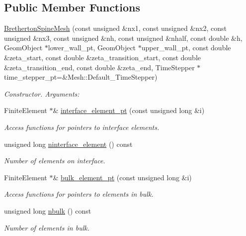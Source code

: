 \subsection*{Public Member Functions}
\begin{DoxyCompactItemize}
\item 
\hyperlink{classoomph_1_1BrethertonSpineMesh_a0e9c404141ee65b000ab4d1fdc4f11da}{Bretherton\+Spine\+Mesh} (const unsigned \&nx1, const unsigned \&nx2, const unsigned \&nx3, const unsigned \&nh, const unsigned \&nhalf, const double \&h, Geom\+Object $\ast$lower\+\_\+wall\+\_\+pt, Geom\+Object $\ast$upper\+\_\+wall\+\_\+pt, const double \&zeta\+\_\+start, const double \&zeta\+\_\+transition\+\_\+start, const double \&zeta\+\_\+transition\+\_\+end, const double \&zeta\+\_\+end, Time\+Stepper $\ast$time\+\_\+stepper\+\_\+pt=\&Mesh\+::\+Default\+\_\+\+Time\+Stepper)
\begin{DoxyCompactList}\small\item\em Constructor. Arguments\+: \end{DoxyCompactList}\item 
Finite\+Element $\ast$\& \hyperlink{classoomph_1_1BrethertonSpineMesh_a3d14f3985d718867099747e5b3750fec}{interface\+\_\+element\+\_\+pt} (const unsigned long \&i)
\begin{DoxyCompactList}\small\item\em Access functions for pointers to interface elements. \end{DoxyCompactList}\item 
unsigned long \hyperlink{classoomph_1_1BrethertonSpineMesh_ae1ecd7c00fe1032e1ee16d7a98156d5c}{ninterface\+\_\+element} () const
\begin{DoxyCompactList}\small\item\em Number of elements on interface. \end{DoxyCompactList}\item 
Finite\+Element $\ast$\& \hyperlink{classoomph_1_1BrethertonSpineMesh_a2fc2b4be08ff93fa313281f82e19d92e}{bulk\+\_\+element\+\_\+pt} (const unsigned long \&i)
\begin{DoxyCompactList}\small\item\em Access functions for pointers to elements in bulk. \end{DoxyCompactList}\item 
unsigned long \hyperlink{classoomph_1_1BrethertonSpineMesh_a47184866746a1fce6dd0ca27ab7e17ce}{nbulk} () const
\begin{DoxyCompactList}\small\item\em Number of elements in bulk. \end{DoxyCompactList}\item 

\end{DoxyCompactItemize}
